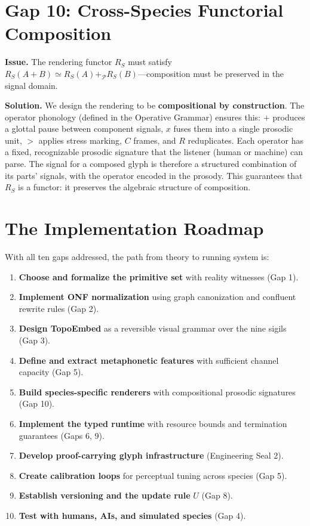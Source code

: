 \documentclass[12pt, letterpaper]{book}
\def\otimes{x}%
\def\oplus{+}%
\def\triangleright{>}%
\def\subset{C}%
\def\circlearrowleft{R}%
\begin{document}
\section{Gap 10: Cross-Species Functorial Composition}

\textbf{Issue.} The rendering functor $R_S$ must satisfy $R_S(A \oplus B) \simeq R_S(A) \oplus_{\mathcal{P}} R_S(B)$---composition must be preserved in the signal domain.

\textbf{Solution.} We design the rendering to be \textbf{compositional by construction}. The operator phonology (defined in the Operative Grammar) ensures this: $\oplus$ produces a glottal pause between component signals, $\otimes$ fuses them into a single prosodic unit, $\triangleright$ applies stress marking, $\subset$ frames, and $\circlearrowleft$ reduplicates. Each operator has a fixed, recognizable prosodic signature that the listener (human or machine) can parse. The signal for a composed glyph is therefore a structured combination of its parts' signals, with the operator encoded in the prosody. This guarantees that $R_S$ is a functor: it preserves the algebraic structure of composition.

\section{The Implementation Roadmap}

With all ten gaps addressed, the path from theory to running system is:

\begin{enumerate}
    \item \textbf{Choose and formalize the primitive set} with reality witnesses (Gap 1).
    \item \textbf{Implement ONF normalization} using graph canonization and confluent rewrite rules (Gap 2).
    \item \textbf{Design TopoEmbed} as a reversible visual grammar over the nine sigils (Gap 3).
    \item \textbf{Define and extract metaphonetic features} with sufficient channel capacity (Gap 5).
    \item \textbf{Build species-specific renderers} with compositional prosodic signatures (Gap 10).
    \item \textbf{Implement the typed runtime} with resource bounds and termination guarantees (Gaps 6, 9).
    \item \textbf{Develop proof-carrying glyph infrastructure} (Engineering Seal 2).
    \item \textbf{Create calibration loops} for perceptual tuning across species (Gap 5).
    \item \textbf{Establish versioning and the update rule} $U$ (Gap 8).
    \item \textbf{Test with humans, AIs, and simulated species} (Gap 4).
\end{enumerate}
\end{document}
